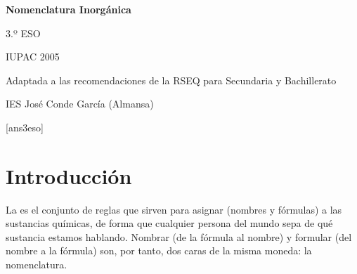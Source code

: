 \documentclass[12pt]{article}
\theoremstyle{mygreennumbox}
\begin{document}
\begin{titlepage}
    \vspace*{5cm}
    \begin{center}
        {\Huge{ \bfseries Nomenclatura Inorgánica}}
    \end{center}
    \vspace*{2cm}
    \begin{center}
        {\huge  3.º ESO}\par\bigskip
        {\huge  IUPAC 2005}\par\medskip
        {\Large Adaptada a las recomendaciones de la RSEQ para Secundaria y Bachillerato}
    \end{center}
    \vspace*{5cm}
    \begin{center}
        {\Large IES José Conde García (Almansa)}
    \end{center}
\end{titlepage}

\tableofcontents

\newpage

[ans3eso]

\section{Introducción}

La  es el conjunto de reglas que sirven para asignar  (nombres y fórmulas) a las sustancias químicas, de forma que cualquier persona del mundo sepa de qué sustancia estamos hablando. Nombrar (de la fórmula al nombre) y formular (del nombre a la fórmula) son, por tanto, dos caras de la misma moneda: la nomenclatura.
\end{document}

